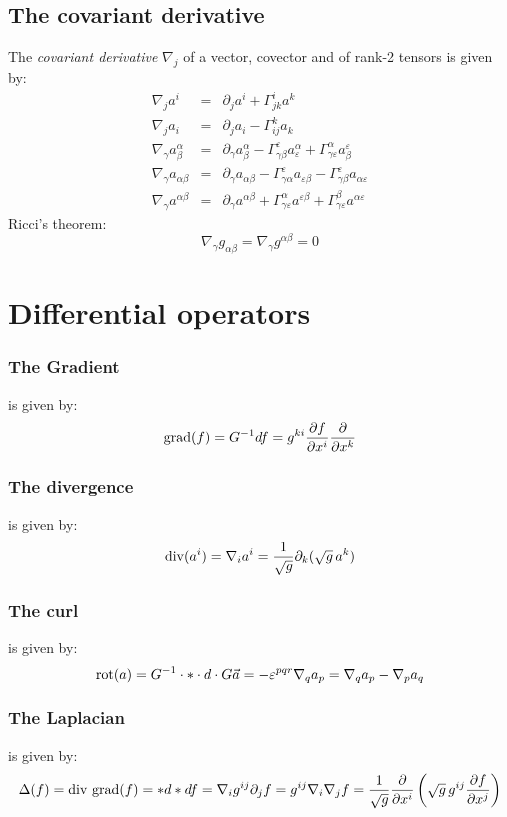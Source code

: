 \documentclass[a4paper,fancyheadings,twoside]{report}
\begin{document}
\subsection{The covariant derivative}
The {\it covariant derivative} $\nabla_j$ of a vector, covector and of
rank-2 tensors is given by:
\begin{eqnarray*}
\nabla_ja^i                  &=&\partial_ja^i+\Gamma^i_{jk}a^k\\
\nabla_ja_i                  &=&\partial_ja_i-\Gamma^k_{ij}a_k\\
\nabla_\gamma a^\alpha_\beta &=&\partial_\gamma a^\alpha_\beta -\Gamma^\varepsilon_{\gamma\beta} a^\alpha_\varepsilon+\Gamma^\alpha_{\gamma\varepsilon}a_\beta^\varepsilon\\
\nabla_\gamma a_{\alpha\beta}&=&\partial_\gamma a_{\alpha\beta}-\Gamma^\varepsilon_{\gamma\alpha}a_{\varepsilon\beta}-\Gamma^\varepsilon_{\gamma\beta}a_{\alpha\varepsilon}\\
\nabla_\gamma a^{\alpha\beta}&=&\partial_\gamma a^{\alpha\beta}+\Gamma^\alpha_{\gamma\varepsilon}a^{\varepsilon\beta}+\Gamma^\beta_{\gamma\varepsilon}a^{\alpha\varepsilon}
\end{eqnarray*}
Ricci's theorem:
\[
\nabla_\gamma g_{\alpha\beta}=\nabla_\gamma g^{\alpha\beta}=0
\]

\section{Differential operators}
\subsubsection{The Gradient}
is given by:
\[
{\rm grad}(f)=G^{-1}df=g^{ki}\frac{\partial f}{\partial x^i}\frac{\partial }{\partial x^k}
\]

\subsubsection{The divergence}
is given by:
\[
{\rm div}(a^i)=\nabla_ia^i=\frac{1}{\sqrt{g}}\partial_k(\sqrt{g}\,a^k)
\]

\subsubsection{The curl}
is given by:
\[
{\rm rot}(a)=G^{-1}\cdot*\cdot d\cdot G\vec{a}=-\varepsilon^{pqr}\nabla_qa_p=\nabla_qa_p-\nabla_pa_q
\]

\subsubsection{The Laplacian}
is given by:
\[
\Delta(f)={\rm div~grad}(f)=*d*df=\nabla_ig^{ij}\partial_jf=g^{ij}\nabla_i\nabla_jf=
\frac{1}{\sqrt{g}}\frac{\partial}{\partial x^i}\left(\sqrt{g}\,g^{ij}\frac{\partial f}{\partial x^j}\right)
\]
\end{document}
